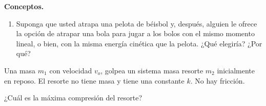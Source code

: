 \begin{mdframed}[style=warning]
	\begin{ejercicio}
		\textbf{Conceptos.}
		\begin{enumerate}
			\item Suponga que usted atrapa una pelota de béisbol y, después, alguien le ofrece la opción de atrapar una bola para jugar a los bolos con el mismo momento lineal, o bien, con la misma energía cinética que la pelota. ¿Qué elegiría? ¿Por qué?

		\end{enumerate}
	\end{ejercicio}
\end{mdframed}











\begin{mdframed}[style=warning]
	\begin{ejercicio}
		Una masa $m_1$ con velocidad $v_o$, golpea un sistema masa resorte $m_2$ inicialmente en reposo. El resorte no tiene masa y tiene una constante $k$. No hay fricción. \\
		\begin{center}
			
		\end{center}
		¿Cuál es la máxima compresión del resorte?
	\end{ejercicio}
\end{mdframed}












